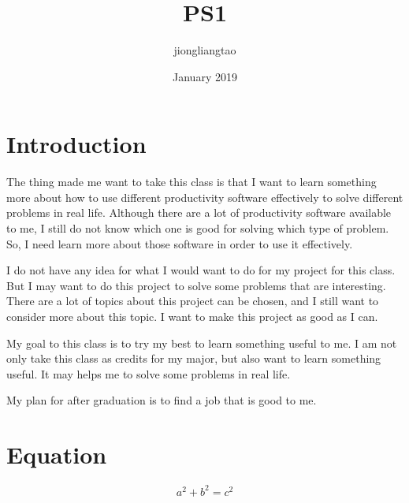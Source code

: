 \documentclass{article}
\title{PS1}
\author{jiongliangtao }
\date{January 2019}
\begin{document}
\maketitle

\section{Introduction}
The thing made me want to take this class is that I want to learn something more about how to use different productivity software effectively to solve different problems in real life. Although there are a lot of productivity software available to me, I still do not know which one is good for solving which type of problem. So, I need learn more about those software in order to use it effectively. 

I do not have any idea for what I would want to do for my project for this class. But I may want to do this project to solve some problems that are interesting. There are a lot of topics about this project can be chosen, and I still want to consider more about this topic. I want to make this project as good as I can. 

My goal to this class is to try my best to learn something useful to me. I am not only take this class as credits for my major, but also want to learn something useful. It may helps me to solve some problems in real life. 

My plan for after graduation is to find a job that is good to me. 
\section{Equation}
\begin{equation}
    a^2+b^2=c^2
\end{equation}
\end{document}
